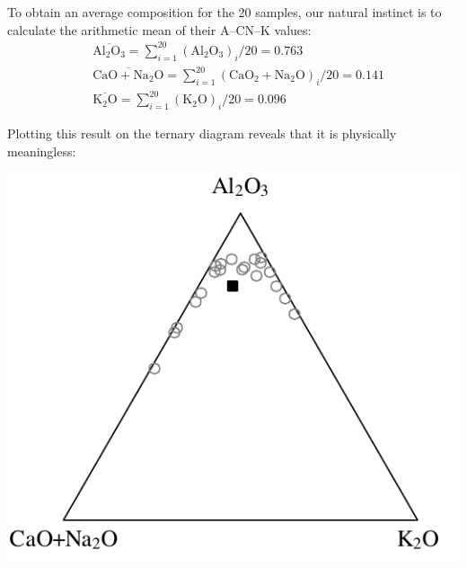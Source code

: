 To obtain an average composition for the 20 samples, our natural
instinct is to calculate the arithmetic mean of their A--CN--K values:
\[
\begin{split}
  &\overline{\mbox{Al}_2\mbox{O}_3} =
  \sum\limits_{i=1}^{20} (\mbox{Al}_2\mbox{O}_3)_i/20 = 0.763 \\
  &\overline{\mbox{CaO} + \mbox{Na}_2\mbox{O}} =
  \sum\limits_{i=1}^{20} (\mbox{CaO}_2+\mbox{Na}_2\mbox{O})_i/20 = 0.141 \\
  &\overline{\mbox{K}_2\mbox{O}} =
  \sum\limits_{i=1}^{20} (\mbox{K}_2\mbox{O})_i/20 = 0.096
\end{split}
\]

Plotting this result on the ternary diagram reveals that it is
physically meaningless:

\noindent\begin{minipage}[t][][b]{.4\textwidth}
\includegraphics[]{../figures/ACNKarithmeticmean.pdf}\medskip
\end{minipage}
\begin{minipage}[t][][t]{.6\textwidth}
  \label{fig:ACNKarithmeticmean}
\end{minipage}

